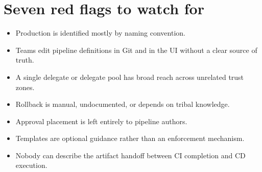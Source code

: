 \documentclass[11pt]{article}
\begin{document}
\section*{Seven red flags to watch for}
\begin{itemize}[leftmargin=1.5em,itemsep=0.25em]
  \item Production is identified mostly by naming convention.
  \item Teams edit pipeline definitions in Git and in the UI without a clear source of truth.
  \item A single delegate or delegate pool has broad reach across unrelated trust zones.
  \item Rollback is manual, undocumented, or depends on tribal knowledge.
  \item Approval placement is left entirely to pipeline authors.
  \item Templates are optional guidance rather than an enforcement mechanism.
  \item Nobody can describe the artifact handoff between CI completion and CD execution.
\end{itemize}
\end{document}
